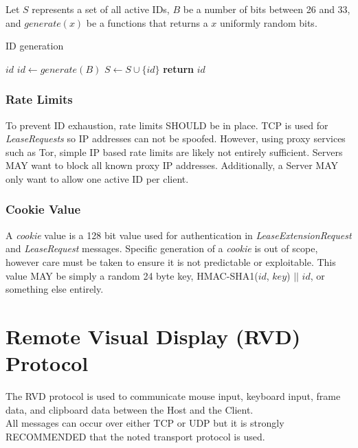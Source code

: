 \documentclass{article}
\begin{document}
    Let $S$ represents a set of all active IDs, $B$ be a number of bits between 26 and 33, and $generate(x)$ be a
    functions that returns a $x$ uniformly random bits.

    \begin{algorithm}
        \caption{ID generation}
        \begin{algorithmic}
            \State $id$
            \Repeat
                \State $id\gets generate(B)$
            \State $S\gets S\cup \{id\}$
            \State \textbf{return} $id$
        \end{algorithmic}
    \end{algorithm}

    \subsubsection{Rate Limits}

    To prevent ID exhaustion, rate limits SHOULD be in place. TCP is used for \emph{LeaseRequests} so IP addresses
    can not be spoofed. However, using proxy services such as Tor, simple IP based rate limits are likely not
    entirely sufficient. Servers MAY want to block all known proxy IP addresses. Additionally, a Server MAY only want
    to allow one active ID per client.

    \subsubsection{Cookie Value}

    A \emph{cookie} value is a 128 bit value used for authentication in \emph{LeaseExtensionRequest} and
    \emph{LeaseRequest} messages. Specific generation of a \emph{cookie} is out of scope, however care must be taken
    to ensure it is not predictable or exploitable. This value MAY be simply a random 24 byte key, HMAC-SHA1($id$,
    $key$) $||$ $id$, or something else entirely.

    \newpage


    \section{Remote Visual Display (RVD) Protocol}

    The RVD protocol is used to communicate mouse input, keyboard input, frame data, and clipboard data between the
    Host and the Client.\\

    All messages can occur over either TCP or UDP but it is strongly RECOMMENDED that the noted transport protocol is
    used.\\
\end{document}
